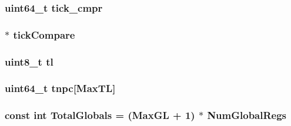 \label{classSparcISA_1_1ISA_a2c38447b8253c8df855e3131c95941a1}
\hypertarget{classSparcISA_1_1ISA_a87a44a4ab3e44b877905a26637748706}{
\subsubsection[{tick\_\-cmpr}]{\setlength{\rightskip}{0pt plus 5cm}uint64\_\-t {\bf tick\_\-cmpr}}}
\label{classSparcISA_1_1ISA_a87a44a4ab3e44b877905a26637748706}
\hypertarget{classSparcISA_1_1ISA_ac35cd2e6db9b53a961d7c27b5ddb06e2}{
\subsubsection[{tickCompare}]{$\ast$ {\bf tickCompare}}}
\label{classSparcISA_1_1ISA_ac35cd2e6db9b53a961d7c27b5ddb06e2}
\hypertarget{classSparcISA_1_1ISA_a245b42e6f340c7874989d56608af5cb5}{
\subsubsection[{tl}]{\setlength{\rightskip}{0pt plus 5cm}uint8\_\-t {\bf tl}}}
\label{classSparcISA_1_1ISA_a245b42e6f340c7874989d56608af5cb5}
\hypertarget{classSparcISA_1_1ISA_afed274d04ab4ab24420bbdd8db997d76}{
\subsubsection[{tnpc}]{\setlength{\rightskip}{0pt plus 5cm}uint64\_\-t {\bf tnpc}\mbox{[}{\bf MaxTL}\mbox{]}}}
\label{classSparcISA_1_1ISA_afed274d04ab4ab24420bbdd8db997d76}
\hypertarget{classSparcISA_1_1ISA_a0022a569233296cddbcb0862a16a0f06}{
\subsubsection[{TotalGlobals}]{\setlength{\rightskip}{0pt plus 5cm}const int {\bf TotalGlobals} = ({\bf MaxGL} + 1) $\ast$ {\bf NumGlobalRegs}}}
